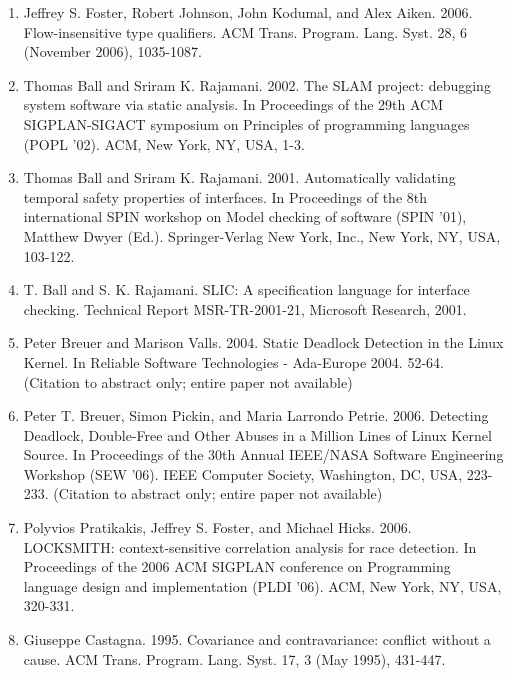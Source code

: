\documentclass{article}
\begin{document}
\begin{enumerate}
	\item %
	Jeffrey S. Foster, Robert Johnson, John Kodumal, and Alex Aiken. 2006. Flow-insensitive type qualifiers. ACM Trans. Program. Lang. Syst. 28, 6 (November 2006), 1035-1087. %
	\item %
	Thomas Ball and Sriram K. Rajamani. 2002. The SLAM project: debugging system software via static analysis. In Proceedings of the 29th ACM SIGPLAN-SIGACT symposium on Principles of programming languages (POPL '02). ACM, New York, NY, USA, 1-3. %
	\item %
	Thomas Ball and Sriram K. Rajamani. 2001. Automatically validating temporal safety properties of interfaces. In Proceedings of the 8th international SPIN workshop on Model checking of software (SPIN '01), Matthew Dwyer (Ed.). Springer-Verlag New York, Inc., New York, NY, USA, 103-122.  %
	\item %
	T. Ball and S. K. Rajamani. SLIC: A specification language for interface checking. Technical Report MSR-TR-2001-21, Microsoft Research, 2001. %
	\item %
	Peter Breuer and Marison Valls. 2004. Static Deadlock Detection in the Linux Kernel. In Reliable Software Technologies - Ada-Europe 2004. 52-64. (Citation to abstract only; entire paper not available) %
	\item %
	Peter T. Breuer, Simon Pickin, and Maria Larrondo Petrie. 2006. Detecting Deadlock, Double-Free and Other Abuses in a Million Lines of Linux Kernel Source. In Proceedings of the 30th Annual IEEE/NASA Software Engineering Workshop (SEW '06). IEEE Computer Society, Washington, DC, USA, 223-233. (Citation to abstract only; entire paper not available) %
	\item %
	Polyvios Pratikakis, Jeffrey S. Foster, and Michael Hicks. 2006. LOCKSMITH: context-sensitive correlation analysis for race detection. In Proceedings of the 2006 ACM SIGPLAN conference on Programming language design and implementation (PLDI '06). ACM, New York, NY, USA, 320-331. %
	\item %
	Giuseppe Castagna. 1995. Covariance and contravariance: conflict without a cause. ACM Trans. Program. Lang. Syst. 17, 3 (May 1995), 431-447. %

\end{enumerate}
\end{document}
